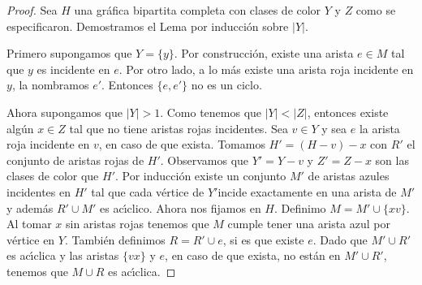 \begin{proof}
    Sea $H$ una gr\'afica bipartita completa con clases de color $Y$ y $Z$ como
    se especificaron. Demostramos el Lema por inducci\'on sobre $|Y|$. 

    Primero supongamos que $Y=\{y\}$. Por construcci\'on, existe una arista $e
    \in M$ tal que $y$ es incidente en $e$. Por otro lado, a lo m\'as existe una
    arista roja incidente en $y$, la nombramos $e'$. Entonces $\{e, e'\}$ no es
    un ciclo.

    Ahora supongamos que $|Y|>1$. Como tenemos que $|Y|<|Z|$, entonces existe
    alg\'un $x \in Z$ tal que no tiene aristas rojas incidentes. Sea $v \in Y$ y
    sea $e$ la arista roja incidente en $v$, en caso de que exista. Tomamos
    $H'= (H-v)-x$ con $R'$ el conjunto de aristas rojas de $H'$. Observamos que
    $Y' = Y- v$ y $Z'= Z- x$ son las clases de color que $H'$. Por inducci\'on
    existe un conjunto $M'$ de aristas azules incidentes en $H'$ tal que cada
    v\'ertice de $Y'$incide exactamente en una arista de $M'$ y adem\'as $R'\cup
    M'$ es ac\'\i{}clico. Ahora nos fijamos en $H$. Definimo $M= M'\cup \{xv\}$.
    Al tomar $x$ sin aristas rojas tenemos que $M$ cumple tener una arista azul
    por v\'ertice en $Y$. Tambi\'en definimos $R= R'\cup e$, si es que existe
    $e$.  Dado que  $M'\cup R'$ es ac\'\i{}clica y las aristas $\{vx\}$ y $e$, en caso de que exista, no
    est\'an en $M'\cup R'$, tenemos que $M \cup R$ es ac\'\i{}clica.
\end{proof}